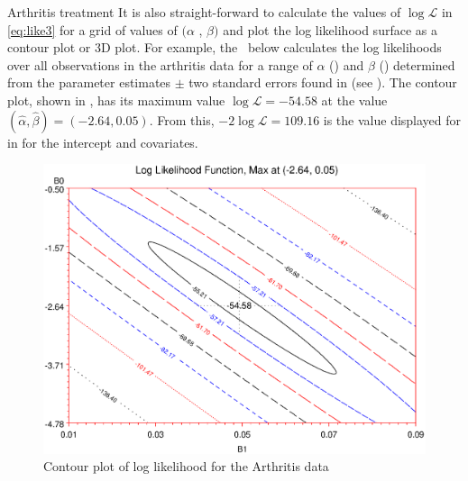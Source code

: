 \begin{Example}[arthrit6a]{Arthritis treatment}
It is also straight-forward to calculate the values of $\log \mathcal{L}$
in \eqref{eq:like3}
for a grid of values of $(\alpha$ , $\beta)$
and plot the log likelihood surface as a contour plot or 3D plot.
For example, the \Dstp\ below calculates the log likelihoods
over all observations in the arthritis data
for a range of $\alpha$ () and $\beta$ ()
determined from the parameter estimates $\pm$ two standard errors
found in 
(see ).
The contour plot, shown in , has its maximum
value $\log \mathcal{L} = -54.58$ at the value
$(\hat{\alpha} , \hat{\beta}) = (-2.64, 0.05)$.  From this,
$-2 \log \mathcal{L} = 109.16$ is the value displayed for  in
 for the intercept and covariates.
\begin{figure}[htb]
  \centering
  \includegraphics[clip,scale=.6]{ch6/fig/likefun}
  \caption{Contour plot of log likelihood for the Arthritis data}%
  \label{fig:likefun}
\end{figure}


\end{Example}
